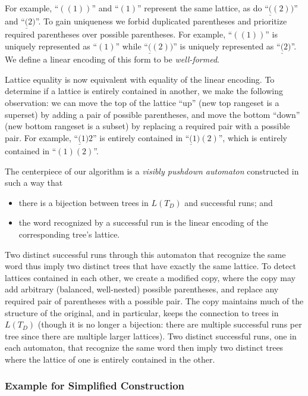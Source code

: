 \documentclass[acmsmall,review,anonymous]{acmart}\settopmatter{printfolios=true,printccs=false,printacmref=false}
\newcommand{\reqpl}{\underline{(}}
\newcommand{\reqpr}{)}
\newcommand{\reqp}[1]{\reqpl#1\reqpr}
\newcommand{\pospl}{(}
\newcommand{\pospr}{)}
\newcommand{\posp}[1]{\pospl#1\pospr}
\begin{document}
For example, ``$\posp{\posp{1}}$'' and ``$\posp{1}$'' represent the same lattice, as do ``$\reqp{\posp{2}}$'' and ``$\reqp{2}$''. To gain uniqueness we forbid duplicated parentheses and prioritize required parentheses over possible parentheses. For example, ``$\posp{\posp{1}}$'' is uniquely represented as ``$\posp{1}$'' while ``$\reqp{\posp{2}}$'' is uniquely represented as ``$\reqp{2}$''. We define a linear encoding of this form to be \emph{well-formed}.

Lattice equality is now equivalent with equality of the linear encoding. To determine if a lattice is entirely contained in another, we make the following observation: we can move the top of the lattice ``up'' (new top rangeset is a superset) by adding a pair of possible parentheses, and move the bottom ``down'' (new bottom rangeset is a subset) by replacing a required pair with a possible pair. For example, ``$\reqp{1}2$'' is entirely contained in ``$\reqp{1}\posp{2}$'', which is entirely contained in ``$\posp{1}\posp{2}$''.

The centerpiece of our algorithm is a \emph{visibly pushdown automaton} constructed in such a way that

\begin{itemize}
\item there is a bijection between trees in $L(T_D)$ and successful runs; and
\item the word recognized by a successful run is the linear encoding of the corresponding tree's lattice.
\end{itemize}

\noindent Two distinct successful runs through this automaton that recognize the same word thus imply two distinct trees that have exactly the same lattice. To detect lattices contained in each other, we create a modified copy, where the copy may add arbitrary (balanced, well-nested) possible parentheses, and replace any required pair of parentheses with a possible pair. The copy maintains much of the structure of the original, and in particular, keeps the connection to trees in $L(T_D)$ (though it is no longer a bijection: there are multiple successful runs per tree since there are multiple larger lattices). Two distinct successful runs, one in each automaton, that recognize the same word then imply two distinct trees where the lattice of one is entirely contained in the other.

\subsubsection{Example for Simplified Construction}
\end{document}
